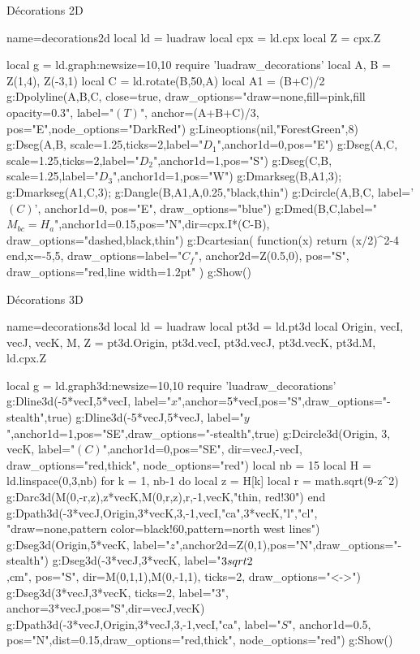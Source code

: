 \begin{demo}{Décorations 2D}
\begin{luadraw}{name=decorations2d}
local ld = luadraw
local cpx = ld.cpx
local Z = cpx.Z

local g = ld.graph:new{size={10,10}}
require 'luadraw_decorations'
local A, B = Z(1,4), Z(-3,1)
local C = ld.rotate(B,50,A)
local A1 = (B+C)/2
g:Dpolyline({A,B,C}, {close=true, draw_options="draw=none,fill=pink,fill opacity=0.3", 
    label="$(T)$", anchor=(A+B+C)/3, pos="E",node_options="DarkRed"})
g:Lineoptions(nil,"ForestGreen",8)
g:Dseg({A,B}, {scale=1.25,ticks=2,label="$D_1$",anchor1d=0,pos="E"})
g:Dseg({A,C}, {scale=1.25,ticks=2,label="$D_2$",anchor1d=1,pos="S"})
g:Dseg({C,B}, {scale=1.25,label="$D_3$",anchor1d=1,pos="W"})
g:Dmarkseg(B,A1,3); g:Dmarkseg(A1,C,3); g:Dangle(B,A1,A,0.25,"black,thin")
g:Dcircle({A,B,C}, {label='$(C)$', anchor1d=0, pos="E", draw_options="blue"})
g:Dmed(B,C,{label="$M_{bc}=H_a$",anchor1d=0.15,pos="N",dir=cpx.I*(C-B), draw_options="dashed,black,thin"})
g:Dcartesian( function(x) return (x/2)^2-4 end,{x={-5,5},
    draw_options={label="$C_f$", anchor2d=Z(0.5,0), pos="S", draw_options="red,line width=1.2pt"} })
g:Show()
\end{luadraw}
\end{demo}

\begin{demo}{Décorations 3D}
\begin{luadraw}{name=decorations3d}
local ld = luadraw
local pt3d = ld.pt3d
local Origin, vecI, vecJ, vecK, M, Z = pt3d.Origin, pt3d.vecI, pt3d.vecJ, pt3d.vecK, pt3d.M, ld.cpx.Z

local g = ld.graph3d:new{size={10,10}}
require 'luadraw_decorations'
g:Dline3d(-5*vecI,5*vecI, {label="$x$",anchor=5*vecI,pos="S",draw_options="-stealth"},true)
g:Dline3d(-5*vecJ,5*vecJ, {label="$y$",anchor1d=1,pos="SE",draw_options="-stealth"},true)
g:Dcircle3d(Origin, 3, vecK, {label="$(C)$",anchor1d=0,pos="SE",
    dir={vecJ,-vecI}, draw_options="red,thick", node_options="red"})
local nb = 15
local H = ld.linspace(0,3,nb)
for k = 1, nb-1 do
    local z = H[k]
    local r = math.sqrt(9-z^2)
    g:Darc3d(M(0,-r,z),z*vecK,M(0,r,z),r,-1,vecK,"thin, red!30")
end
g:Dpath3d({-3*vecJ,Origin,3*vecK,3,-1,vecI,"ca",3*vecK,"l","cl"},
    "draw=none,pattern color=black!60,pattern=north west lines")
g:Dseg3d({Origin,5*vecK}, 
    {label="$z$",anchor2d=Z(0,1),pos="N",draw_options="-stealth"})   
g:Dseg3d({-3*vecJ,3*vecK}, {label="$3\\sqrt 2$\\,cm", pos="S", dir={M(0,1,1),M(0,-1,1)},
    ticks=2, draw_options="<->"}) 
g:Dseg3d({3*vecJ,3*vecK}, 
    {ticks=2, label="$3$", anchor=3*vecJ,pos="S",dir={vecJ,vecK}}) 
g:Dpath3d({-3*vecJ,Origin,3*vecJ,3,-1,vecI,"ca"}, 
    {label="$S$", anchor1d=0.5, pos="N",dist=0.15,draw_options="red,thick", node_options="red"})
g:Show()
\end{luadraw}
\end{demo}
